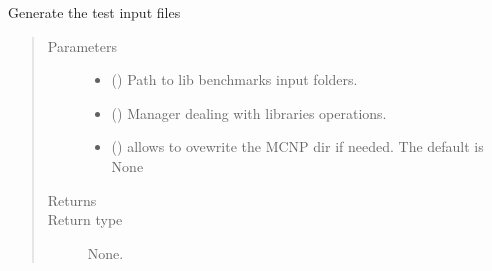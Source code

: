 \documentclass[letterpaper,10pt,english]{sphinxmanual}
\begin{document}
\begin{fulllineitems}
\begin{fulllineitems}
\label{\detokenize{api/inputgeneration:testrun.Test.generate_test}}
\sphinxAtStartPar
Generate the test input files
\begin{quote}\begin{description}
\item[{Parameters}] \leavevmode\begin{itemize}
\item {} 
\sphinxAtStartPar
{} () \textendash{} Path to lib benchmarks input folders.

\item {} 
\sphinxAtStartPar
{} ({\hyperref[\detokenize{api/initobjects:libmanager.LibManager}]{}}) \textendash{} Manager dealing with libraries operations.

\item {} 
\sphinxAtStartPar
{} () \textendash{} allows to ovewrite the MCNP dir if needed. The default is None

\end{itemize}

\item[{Returns}] \leavevmode
\sphinxAtStartPar


\item[{Return type}] \leavevmode
\sphinxAtStartPar
None.

\end{description}\end{quote}

\end{fulllineitems}



\end{fulllineitems}
\end{document}
